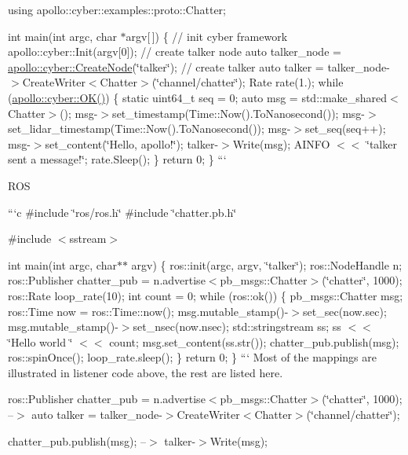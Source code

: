 using apollo\-::cyber\-::examples\-::proto\-::\-Chatter;

int main(int argc, char $\ast$argv\mbox{[}$\,$\mbox{]}) \{ // init cyber framework apollo\-::cyber\-::\-Init(argv\mbox{[}0\mbox{]}); // create talker node auto talker\-\_\-node = \hyperlink{namespaceapollo_1_1cyber_ae369c5de0279f2a5745d0438d532bc89}{apollo\-::cyber\-::\-Create\-Node}(\char`\"{}talker\char`\"{}); // create talker auto talker = talker\-\_\-node-\/$>$Create\-Writer$<$\-Chatter$>$(\char`\"{}channel/chatter\char`\"{}); Rate rate(1.); while (\hyperlink{namespaceapollo_1_1cyber_aafa5f9962b51918897897bbc0fdd802f}{apollo\-::cyber\-::\-O\-K()}) \{ static uint64\-\_\-t seq = 0; auto msg = std\-::make\-\_\-shared$<$\-Chatter$>$(); msg-\/$>$set\-\_\-timestamp(Time\-::\-Now().To\-Nanosecond()); msg-\/$>$set\-\_\-lidar\-\_\-timestamp(Time\-::\-Now().To\-Nanosecond()); msg-\/$>$set\-\_\-seq(seq++); msg-\/$>$set\-\_\-content(\char`\"{}\-Hello, apollo!\char`\"{}); talker-\/$>$Write(msg); A\-I\-N\-F\-O $<$$<$ \char`\"{}talker sent a message!\char`\"{}; rate.\-Sleep(); \} return 0; \} ```

R\-O\-S

```c \#include \char`\"{}ros/ros.\-h\char`\"{} \#include \char`\"{}chatter.\-pb.\-h\char`\"{}

\#include $<$sstream$>$

int main(int argc, char$\ast$$\ast$ argv) \{ ros\-::init(argc, argv, \char`\"{}talker\char`\"{}); ros\-::\-Node\-Handle n; ros\-::\-Publisher chatter\-\_\-pub = n.\-advertise$<$pb\-\_\-msgs\-::\-Chatter$>$(\char`\"{}chatter\char`\"{}, 1000); ros\-::\-Rate loop\-\_\-rate(10); int count = 0; while (ros\-::ok()) \{ pb\-\_\-msgs\-::\-Chatter msg; ros\-::\-Time now = ros\-::\-Time\-::now(); msg.\-mutable\-\_\-stamp()-\/$>$set\-\_\-sec(now.\-sec); msg.\-mutable\-\_\-stamp()-\/$>$set\-\_\-nsec(now.\-nsec); std\-::stringstream ss; ss $<$$<$ \char`\"{}\-Hello world \char`\"{} $<$$<$ count; msg.\-set\-\_\-content(ss.\-str()); chatter\-\_\-pub.\-publish(msg); ros\-::spin\-Once(); loop\-\_\-rate.\-sleep(); \} return 0; \} ``` Most of the mappings are illustrated in listener code above, the rest are listed here.


\begin{DoxyItemize}
\item {\ttfamily ros\-::\-Publisher chatter\-\_\-pub = n.\-advertise$<$pb\-\_\-msgs\-::\-Chatter$>$(\char`\"{}chatter\char`\"{}, 1000);} --$>$ {\ttfamily auto talker = talker\-\_\-node-\/$>$Create\-Writer$<$Chatter$>$(\char`\"{}channel/chatter\char`\"{});}
\item {\ttfamily chatter\-\_\-pub.\-publish(msg);} --$>$ {\ttfamily talker-\/$>$Write(msg);}
\end{DoxyItemize}

